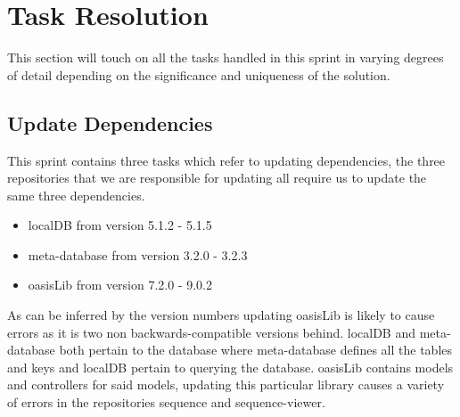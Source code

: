 \section{Task Resolution}
This section will touch on all the tasks handled in this sprint in varying degrees of detail depending on the significance and uniqueness of the solution.

\subsection{Update Dependencies}
This sprint contains three tasks which refer to updating dependencies, the three repositories that we are responsible for updating all require us to update the same three dependencies.
\begin{itemize}
    \item localDB from version 5.1.2 - 5.1.5
    \item meta-database from version 3.2.0 - 3.2.3
    \item oasisLib from version 7.2.0 - 9.0.2
\end{itemize}
As can be inferred by the version numbers updating oasisLib is likely to cause errors as it is two non backwards-compatible versions behind.
localDB and meta-database both pertain to the database where meta-database defines all the tables and keys and localDB pertain to querying the database. 
oasisLib contains models and controllers for said models, updating this particular library causes a variety of errors in the repositories sequence and sequence-viewer.
